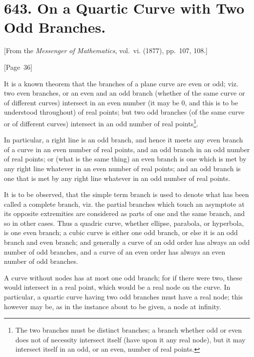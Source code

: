 \documentclass[11pt,a4paper]{book}
\begin{document}
\newpage
\section*{643. On a Quartic Curve with Two Odd Branches.}

[From the \textit{Messenger of Mathematics}, vol.~vi. (1877), pp.~107, 108.]

\begin{center}
[Page~36]
\end{center}

It is a known theorem that the branches of a plane curve are even or odd;
viz. two even branches, or an even and an odd branch (whether of the
same curve or of different curves) intersect in an even number (it may
be 0, and this is to be understood throughout) of real points; but two
odd branches (of the same curve or of different curves) intersect in an
odd number of real points\footnote{The two branches must be distinct branches; a branch whether odd or
even does not of necessity intersect itself (have upon it any real node),
but it may intersect itself in an odd, or an even, number of real points.}.

In particular, a right line is an odd branch, and hence it meets any
even branch of a curve in an even number of real points, and an odd
branch in an odd number of real points; or (what is the same thing) an
even branch is one which is met by any right line whatever in an even
number of real points; and an odd branch is one that is met by any
right line whatever in an odd number of real points.

It is to be observed, that the simple term branch is used to denote
what has been called a complete branch, viz. the partial branches which
touch an asymptote at its opposite extremities are considered as parts
of one and the same branch, and so in other cases. Thus a quadric
curve, whether ellipse, parabola, or hyperbola, is one even branch; a
cubic curve is either one odd branch, or else it is an odd branch and
even branch; and generally a curve of an odd order has always an odd
number of odd branches, and a curve of an even order has always an
even number of odd branches.

A curve without nodes has at most one odd branch; for if there were
two, these would intersect in a real point, which would be a real node
on the curve. In particular, a quartic curve having two odd branches
must have a real node; this however may be, as in the instance about
to be given, a node at infinity.
\end{document}
